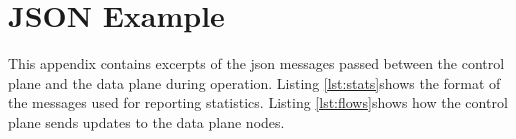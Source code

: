 

\cleardoublepage
\chapter{JSON Example}
\label{appendix:format}

This appendix contains excerpts of the json messages passed between the control plane and the data plane during operation. Listing \ref{lst:stats}shows the format of the messages used for reporting statistics. Listing \ref{lst:flows}shows how the control plane sends updates to the data plane nodes.






